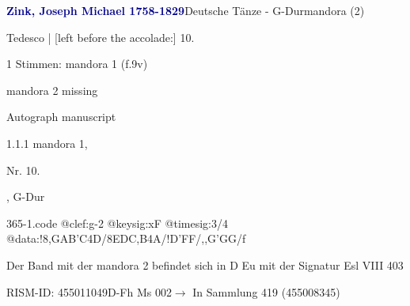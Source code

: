 \documentclass[twocolumn, 12pt]{book}
\begin{document}
\par \vspace{16pt} \textcolor{darkblue}{\textbf{Zink, Joseph Michael  1758-1829}}\hfillplus{\textbf{[365]}}\newline Deutsche Tänze - G-Dur\newline mandora (2)
\par \begin{itshape}[f.9v, at left:] Tedesco | [left before the accolade:] 10.\end{itshape} 
\par \textcolor{darkblue}{}  1 Stimmen: mandora 1  (f.9v)\newline \begin{small} mandora 2 missing\end{small} \newline Autograph manuscript
\par 1.1.1  mandora 1, \begin{itshape}Nr. 10.\end{itshape}, G-Dur  
\begin{filecontents*}{365-1.code}
@clef:g-2
@keysig:xF
@timesig:3/4
@data:!{8,GAB'C}4D/{8EDC,B}4A/!D'FF/,,G'GG/f
\end{filecontents*}
\newline %
\par Der Band mit der mandora 2 befindet sich in D Eu mit der Signatur Esl VIII 403
\par RISM-ID: 455011049\newline D-Fh  Ms 002\newline $\rightarrow$ In Sammlung 419 (455008345)
      
\end{document}
